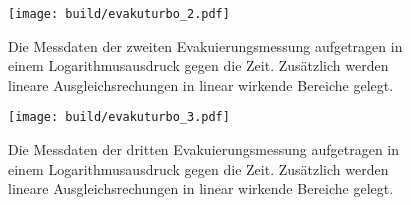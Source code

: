     \begin{figure}
      \centering
      \texttt{[image: build/evakuturbo\_2.pdf]}
      \caption{Die Messdaten der zweiten Evakuierungsmessung aufgetragen in einem Logarithmusausdruck gegen die Zeit. Zusätzlich werden lineare Ausgleichsrechungen in linear wirkende Bereiche gelegt.}
      \label{fig:evaku_turbo_2}
    \end{figure}

    \begin{figure}
      \centering
      \texttt{[image: build/evakuturbo\_3.pdf]}
      \caption{Die Messdaten der dritten Evakuierungsmessung aufgetragen in einem Logarithmusausdruck gegen die Zeit. Zusätzlich werden lineare Ausgleichsrechungen in linear wirkende Bereiche gelegt.}
      \label{fig:evaku_turbo_3}
    \end{figure}


